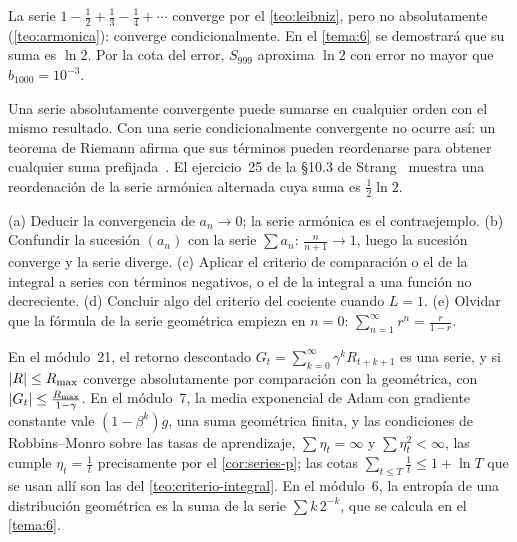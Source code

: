 \begin{ejemplo}\label{ej:armonica-alternada}
La serie $1-\frac12+\frac13-\frac14+\cdots$ converge por el \cref{teo:leibniz}, pero no absolutamente (\cref{teo:armonica}): converge condicionalmente. En el \cref{tema:6} se demostrará que su suma es $\ln2$. Por la cota del error, $S_{999}$ aproxima $\ln2$ con error no mayor que $b_{1000}=10^{-3}$.
\end{ejemplo}

\begin{observacion}[Reordenaciones]
Una serie absolutamente convergente puede sumarse en cualquier orden con el mismo resultado. Con una serie condicionalmente convergente no ocurre así: un teorema de Riemann afirma que sus términos pueden reordenarse para obtener cualquier suma prefijada~\cite[cap.~23]{spivak}. El ejercicio~25 de la §10.3 de Strang~\cite{strang} muestra una reordenación de la serie armónica alternada cuya suma es $\frac12\ln2$.
\end{observacion}

\begin{observacion}\label{obs:5-errores}
(a) Deducir la convergencia de $a_n\to0$; la serie armónica es el contraejemplo. (b) Confundir la sucesión $(a_n)$ con la serie $\sum a_n$: $\frac{n}{n+1}\to1$, luego la sucesión converge y la serie diverge. (c) Aplicar el criterio de comparación o el de la integral a series con términos negativos, o el de la integral a una función no decreciente. (d) Concluir algo del criterio del cociente cuando $L=1$. (e) Olvidar que la fórmula de la serie geométrica empieza en $n=0$: $\sum_{n=1}^{\infty}r^{n}=\frac{r}{1-r}$.
\end{observacion}

\begin{observacion}
En el módulo~21, el retorno descontado $G_t=\sum_{k=0}^{\infty}\gamma^{k}R_{t+k+1}$ es una serie, y si $\lvert R\rvert\le R_{\max}$ converge absolutamente por comparación con la geométrica, con $\lvert G_t\rvert\le\frac{R_{\max}}{1-\gamma}$. En el módulo~7, la media exponencial de Adam con gradiente constante vale $(1-\beta^{k})g$, una suma geométrica finita, y las condiciones de Robbins--Monro sobre las tasas de aprendizaje, $\sum\eta_t=\infty$ y $\sum\eta_t^{2}<\infty$, las cumple $\eta_t=\frac1t$ precisamente por el \cref{cor:series-p}; las cotas $\sum_{t\le T}\frac1t\le1+\ln T$ que se usan allí son las del \cref{teo:criterio-integral}. En el módulo~6, la entropía de una distribución geométrica es la suma de la serie $\sum k\,2^{-k}$, que se calcula en el \cref{tema:6}.
\end{observacion}

